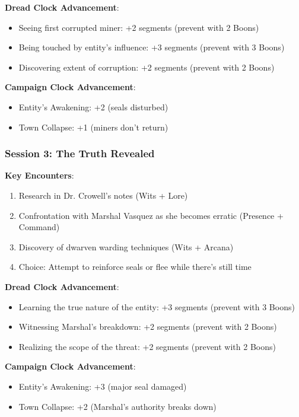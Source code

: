 \documentclass[11pt]{article}
\begin{document}
\textbf{Dread Clock Advancement}: 
\begin{itemize}[leftmargin=*]
\item Seeing first corrupted miner: +2 segments (prevent with 2 Boons)
\item Being touched by entity's influence: +3 segments (prevent with 3 Boons)
\item Discovering extent of corruption: +2 segments (prevent with 2 Boons)
\end{itemize}

\textbf{Campaign Clock Advancement}:
\begin{itemize}[leftmargin=*]
\item Entity's Awakening: +2 (seals disturbed)
\item Town Collapse: +1 (miners don't return)
\end{itemize}

\subsubsection*{Session 3: The Truth Revealed}

\textbf{Key Encounters}:
\begin{enumerate}[leftmargin=*]
\item Research in Dr. Crowell's notes (Wits + Lore)
\item Confrontation with Marshal Vasquez as she becomes erratic (Presence + Command)
\item Discovery of dwarven warding techniques (Wits + Arcana)
\item Choice: Attempt to reinforce seals or flee while there's still time
\end{enumerate}

\textbf{Dread Clock Advancement}: 
\begin{itemize}[leftmargin=*]
\item Learning the true nature of the entity: +3 segments (prevent with 3 Boons)
\item Witnessing Marshal's breakdown: +2 segments (prevent with 2 Boons)
\item Realizing the scope of the threat: +2 segments (prevent with 2 Boons)
\end{itemize}

\textbf{Campaign Clock Advancement}:
\begin{itemize}[leftmargin=*]
\item Entity's Awakening: +3 (major seal damaged)
\item Town Collapse: +2 (Marshal's authority breaks down)
\end{itemize}
\end{document}
